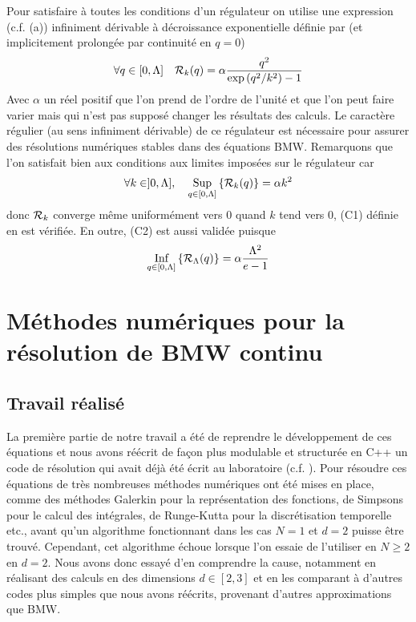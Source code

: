 \documentclass[10.5pt]{article}
\begin{document}
\begin{multicols*}{2}
Pour satisfaire à toutes les conditions d'un régulateur on utilise une expression (c.f.  (a)) infiniment dérivable à décroissance exponentielle définie par (et implicitement prolongée par continuité en $q = 0$)
\begin{equation}
	\forall q \in [0, \Lambda] \quad \mathcal{R}_k(q) = \alpha \frac{q^2}{\exp{(q^2/k^2)}-1}
	\label{eq:RegExp}
\end{equation}
Avec $\alpha$ un réel positif que l'on prend de l'ordre de l'unité et que l'on peut faire varier mais qui n'est pas supposé changer les résultats des calculs. Le caractère régulier (au sens infiniment dérivable) de ce régulateur est nécessaire pour assurer des résolutions numériques stables dans des équations BMW.  Remarquons que l'on satisfait bien aux conditions aux limites imposées sur le régulateur car 
\begin{equation}
	\forall k \in ]0,\Lambda],  \quad \underset{q \in [0, \Lambda]}{ \text{Sup}} \left\{ \mathcal{R}_k(q) \right\} = \alpha k^2
\end{equation}
donc $\mathcal{R}_k$ converge même uniformément vers 0 quand $k$ tend vers 0, (C1) définie en  est vérifiée. En outre, (C2) est aussi validée puisque
\begin{equation}
	\underset{q \in [0, \Lambda]}{ \text{Inf}} \left\{ \mathcal{R}_\Lambda(q) \right\} = \alpha \frac{\Lambda^2}{e-1}
\end{equation}


\vspace*{11pt}

\section{Méthodes numériques pour la résolution de BMW continu}

\label{sec:NumContinu}

\subsection{Travail réalisé}


La première partie de notre travail a été de reprendre le développement de ces équations et nous avons réécrit de façon plus modulable et structurée en C++ un code de résolution qui avait déjà été écrit au laboratoire (c.f. ). Pour résoudre ces équations de très nombreuses méthodes numériques ont été mises en place, comme des méthodes Galerkin \cite{shen1994efficient, LeonardThesis} pour la représentation des fonctions, de Simpsons pour le calcul des intégrales, de Runge-Kutta pour la discrétisation temporelle etc., avant qu'un algorithme fonctionnant dans les cas $N=1$ et $d=2$ puisse être trouvé. Cependant, cet algorithme échoue lorsque l'on essaie de l'utiliser en $N \ge 2$ en $d=2$. Nous avons donc essayé d'en comprendre la cause, notamment en réalisant des calculs en des dimensions $d \in [2,3]$ et en les comparant à d'autres codes plus simples que nous avons réécrits, provenant d'autres approximations que BMW. \\





\end{multicols*}
\end{document}

